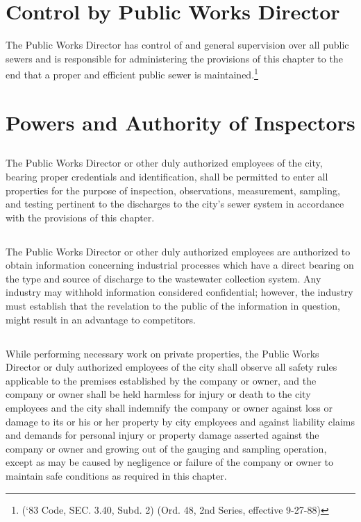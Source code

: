 
\setcounter{section}{69}
\section{Control by Public Works Director}
The Public Works Director has control of and general supervision over all public sewers and is responsible for administering the provisions of this chapter to the end that a proper and efficient public sewer is maintained.\footnote{(‘83 Code, SEC. 3.40, Subd. 2) (Ord. 48, 2nd Series, effective 9-27-88)}

\section{Powers and Authority of Inspectors}
\subsection{}
The Public Works Director or other duly authorized employees of the city, bearing proper credentials and identification, shall be permitted to enter all properties for the purpose of inspection, observations, measurement, sampling, and testing pertinent to the discharges to the city’s sewer system in accordance with the provisions of this chapter.
\subsection{}
The Public Works Director or other duly authorized employees are authorized to obtain information concerning industrial processes which have a direct bearing on the type and source of discharge to the wastewater collection system.  Any industry may withhold information considered confidential; however, the industry must establish that the revelation to the public of the information in question, might result in an advantage to competitors.
\subsection{}
While performing necessary work on private properties, the Public Works Director or duly authorized employees of the city shall observe all safety rules applicable to the premises established by the company or owner, and the company or owner shall be held harmless for injury or death to the city employees and the city shall indemnify the company or owner against loss or damage to its or his or her property by city employees and against liability claims and demands for personal injury or property damage asserted against the company or owner and growing out of the gauging and sampling operation, except as may be caused by negligence or failure of the company or owner to maintain safe conditions as required in this chapter.
